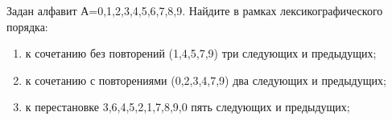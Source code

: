 \question 
Задан алфавит А={0,1,2,3,4,5,6,7,8,9}. Найдите в рамках лексикографического порядка:
\begin{enumerate}
\item  к сочетанию без повторений (1,4,5,7,9) три следующих и предыдущих;
\item  к сочетанию с повторениями (0,2,3,4,7,9) два следующих и предыдущих;
\item  к перестановке 3,6,4,5,2,1,7,8,9,0 пять следующих и предыдущих;
\end{enumerate}
